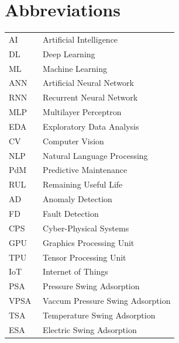 \chapter*{Abbreviations}


\begin{flushleft}
\begin{tabular}{l p{0.8\linewidth}}
AI    & Artificial Intelligence\\
DL    & Deep Learning\\
ML    & Machine Learning\\
ANN   & Artificial Neural Network\\
RNN   & Recurrent Neural Network\\
MLP   & Multilayer Perceptron\\
EDA   & Exploratory Data Analysis\\
CV    & Computer Vision\\
NLP   & Natural Language Processing\\
PdM   & Predictive Maintenance\\  
RUL   & Remaining Useful Life\\  
AD    & Anomaly Detection\\  
FD    & Fault Detection\\  
CPS   & Cyber-Physical Systems\\
GPU   & Graphics Processing Unit\\
TPU   & Tensor Processing Unit\\
IoT   & Internet of Things\\
PSA   & Pressure Swing Adsorption\\
VPSA  & Vaccum Pressure Swing Adsorption\\
TSA   & Temperature Swing Adsorption\\
ESA   & Electric Swing Adsorption\\
\end{tabular}
\end{flushleft}

